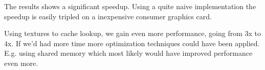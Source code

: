 
\begin{comment}
#+ORGTBL: SEND numbers orgtbl-to-latex :splice t :skip 2
|------------------+-------------+-------------+-----------|
|                  | CPU         | GPU         |   Speedup |
|------------------+-------------+-------------+-----------|
| Reinitialization | 417825 usec | 136675 usec | 3.0570697 |
| - with textures  | -           | 100006 usec | 4.1779993 |
|------------------+-------------+-------------+-----------|
#+TBLFM: @2$4=@2$2 / @2$3::@3$4=@2$2 / @3$3
\end{comment}

The results shows a significant speedup. Using a quite naive
implementation the speedup is easily tripled on a inexpensive consumer
graphics card.

Using textures to cache lookup, we gain even more performance, going
from 3x to 4x. If we'd had more time more optimization techniques
could have been applied. E.g. using shared memory which most likely
would have improved performance even more.






